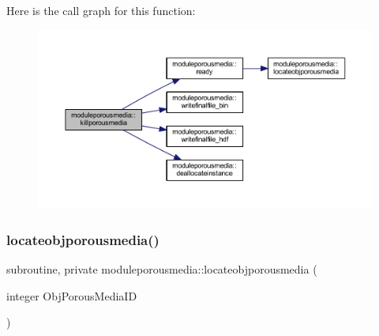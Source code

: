 Here is the call graph for this function\+:\nopagebreak
\begin{figure}[H]
\begin{center}
\leavevmode
\includegraphics[width=350pt]{namespacemoduleporousmedia_a0935fa1b37d6d9dcbd156944ae27cbe3_cgraph}
\end{center}
\end{figure}
\mbox{\label{namespacemoduleporousmedia_ac6ac9e34fbd80443bbf33b5006e8b25e}} 
\subsubsection{\texorpdfstring{locateobjporousmedia()}{locateobjporousmedia()}}
{\footnotesize\ttfamily subroutine, private moduleporousmedia\+::locateobjporousmedia (\begin{DoxyParamCaption}\item[{integer}]{Obj\+Porous\+Media\+ID }\end{DoxyParamCaption})\hspace{0.3cm}{\ttfamily [private]}}

